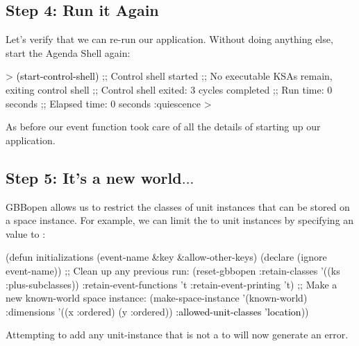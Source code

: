 \documentclass[10pt,twoside,english,pdftex]{article}
\begin{document}
\subsection*{Step 4: Run it Again}

%
Let's verify that we can re-run our application. Without doing anything else,
start the Agenda Shell again:
%
\begin{example}\color{darkergray}%
  > \textcolor{black}{(start-control-shell)}
  ;; Control shell started
  ;; No executable KSAs remain, exiting control shell
  ;; Control shell exited: 3 cycles completed
  ;; Run time: 0 seconds
  ;; Elapsed time: 0 seconds
  :quiescence
  >
\end{example}

As before our  event function took care of all the
details of starting up our application.

\subsection*{Step 5: It's a new world$\ldots$}

%
GBBopen allows us to restrict the classes of unit instances that can be stored
on a space instance.  For example, we can limit the  to
 unit instances by specifying an 
value to :
%
\begin{example}\color{darkergray}%
  (defun initializations (event-name &key &allow-other-keys)
    (declare (ignore event-name))
    ;; Clean up any previous run:
    (reset-gbbopen :retain-classes '((ks :plus-subclasses))
                   :retain-event-functions 't
                   :retain-event-printing 't)
    ;; Make a new known-world space instance:
    (make-space-instance 
     '(known-world)
     :dimensions '((x :ordered) (y :ordered))
     \textcolor{black}{:allowed-unit-classes 'location}))
\end{example}
%
Attempting to add any unit-instance that is not a  to
 will now generate an error.
\end{document}
